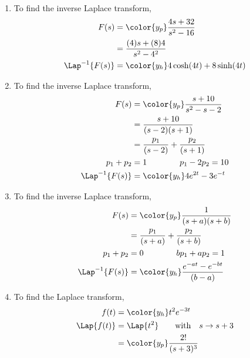 \begin{enumerate}
    \item To find the inverse Laplace transform,
          \begin{align}
              F(s)              & = \color{y_p} \frac{4s + 32}{s^2 - 16} \\
                                & = \frac{(4)s + (8)4}{s^2 - 4^2}        \\
              \Lap^{-1}\{F(s)\} & = \color{y_h} 4\cosh(4t) + 8\sinh(4t)
          \end{align}

    \item To find the inverse Laplace transform,
          \begin{align}
              F(s)              & = \color{y_p} \frac{s + 10}{s^2 - s - 2} \\
                                & = \frac{s+10}{(s-2)(s+1)}                \\
                                & = \frac{p_1}{(s-2)} + \frac{p_2}{(s+1)}  \\
              p_1 + p_2         & = 1 \qquad\qquad p_1 - 2p_2 = 10         \\
              \Lap^{-1}\{F(s)\} & = \color{y_h} 4e^{2t} - 3e^{-t}
          \end{align}

    \item To find the inverse Laplace transform,
          \begin{align}
              F(s)              & = \color{y_p} \frac{1}{(s+a)(s+b)}            \\
                                & = \frac{p_1}{(s+a)} + \frac{p_2}{(s+b)}       \\
              p_1 + p_2         & = 0 \qquad\qquad bp_1 + ap_2 = 1              \\
              \Lap^{-1}\{F(s)\} & = \color{y_h} \frac{e^{-at} - e^{-bt}}{(b-a)}
          \end{align}

    \item To find the Laplace transform,
          \begin{align}
              f(t)         & = \color{y_h} t^2e^{-3t}           \\
              \Lap\{f(t)\} & = \Lap\{t^2\} \qquad
              \text{with}\quad s \to s+3                        \\
                           & = \color{y_p} \frac{2!}{(s+3)^{3}}
          \end{align}


\end{enumerate}
